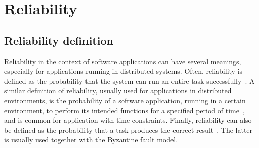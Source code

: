 \documentclass{cslthse-msc}
\begin{document}
\section{Reliability} \label{sec:background_reliability}
\subsection{Reliability definition} \label{subsec:background_reliability_definition}
Reliability in the context of software applications can have several meanings, especially for applications running in distributed systems. Often, reliability is defined as the probability that the system can run an entire task successfully~\cite{taskAllocation, relModelDistSimSystem, studyServiceRel, hierarchicalRelModeling, generalAlgoRelEval, realTimeRelAnalysis, selfAdaptRel, perfRelNonMarkovian}. A similar definition of reliability, usually used for applications in distributed environments, is the probability of a software application, running in a certain environment, to perform its intended functions for a specified period of time~\cite{surveyReliabilityDistr, surveyRelPrediction, relDistApplications}, and is common for application with time constraints. Finally, reliability can also be defined as the probability that a task produces the correct result~\cite{surveyRelPrediction, relAndPerfGridServices, relGridServicePredConstraint, relModelWebServices, selfAdaptRel}. The latter is usually used together with the Byzantine fault model. 

\end{document}
